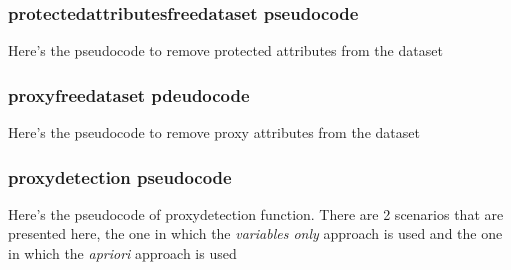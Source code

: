 \documentclass[12pt,a4paper,openright,twoside]{book}
\begin{document}
\subsubsection{protected\textunderscore attributes\textunderscore free\textunderscore dataset pseudocode}
Here's the pseudocode to remove protected attributes from the dataset

\begin{algorithm}[H]
\end{algorithm}

\subsubsection{proxy\textunderscore free\textunderscore dataset pdeudocode}
Here's the pseudocode to remove proxy attributes from the dataset

\begin{algorithm}[H]
\end{algorithm}

\subsubsection{proxy\textunderscore detection pseudocode}
Here's the pseudocode of proxy\textunderscore detection function. There are 2 scenarios that are presented here, the one in which the \emph{variables only}  approach is used and the one in which the \emph{apriori} approach is used
\end{document}
